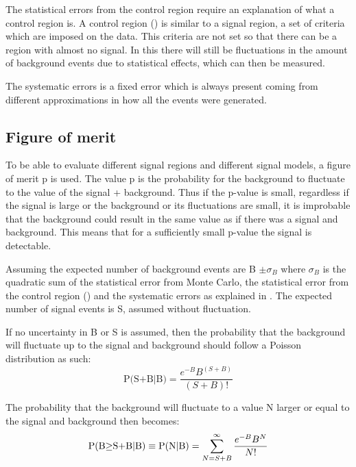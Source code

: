 The statistical errors from the control region require an explanation of what a control region is. A control region (\abbrCR) is similar to a signal region, a set of criteria which are imposed on the data. This criteria are not set so that there can be a region with almost no signal. In this \abbrCR there will still be fluctuations in the amount of background events due to statistical effects, which can then be measured. 

The systematic errors is a fixed error which is always present coming from different approximations in how all the events were generated. 

\subsection{Figure of merit}\label{subsec:figmer}
To be able to evaluate different signal regions and different signal models, a figure of merit p is used. The value p is the probability for the background to fluctuate to the value of the signal + background. Thus if the p-value is small, regardless if the signal is large or the background or its fluctuations are small, it is improbable that the background could result in the same value as if there was a signal and background. This means that for a sufficiently small p-value the signal is detectable.  

Assuming the expected number of background events are B $\pm \sigma_B$ where $\sigma_B$ is the quadratic sum of the statistical error from Monte Carlo, the statistical error from the control region (\abbrCR) and the systematic errors as explained in . The expected number of signal events is S, assumed without fluctuation. 

If no uncertainty in B or S is assumed, then the probability that the background will fluctuate up to the signal and background should follow a Poisson distribution as such:
\begin{equation}
\text{P(S+B|B)}=\frac{e^{-B}B^{(S+B)}}{(S+B)!}
\end{equation} 

The probability that the background will fluctuate to a value N larger or equal to the signal and background then becomes:
\begin{equation}
\text{P(B$ \geq$S+B|B)} \equiv \text{P(N|B)}=\sum_{N=S+B}^{\infty}  \frac{e^{-B}B^N}{N!}
\end{equation} 

